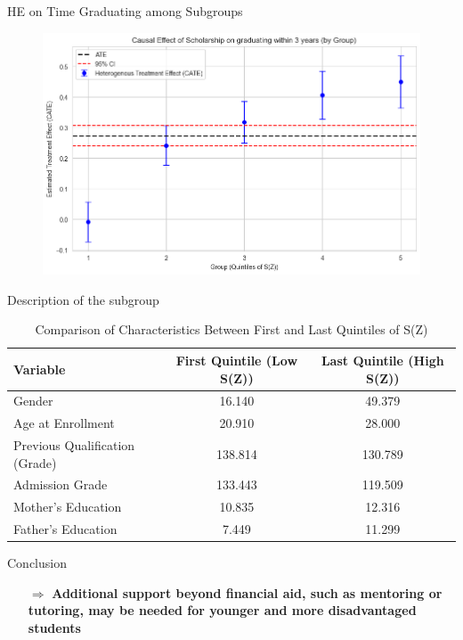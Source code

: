 \documentclass[aspectratio=169]{beamer}
\begin{document}
\begin{frame}{HE on Time Graduating among Subgroups}

\begin{figure}[h!]  
        \includegraphics[width=0.9\linewidth]{Tex_Pictures/HE_quintile_graduating.png} 

 
 \end{figure}   
\end{frame}



\begin{frame}{Description of the subgroup}
\begin{table}[h]
    \centering
    \begin{tabular}{l c c}
        \hline
        \textbf{Variable} & \textbf{First Quintile (Low S(Z))} & \textbf{Last Quintile (High S(Z))} \\
        \hline
        Gender & 16.140 & 49.379 \\
        Age at Enrollment & 20.910 & 28.000 \\
        Previous Qualification (Grade) & 138.814 & 130.789 \\
        Admission Grade & 133.443 & 119.509 \\
        Mother’s Education & 10.835 & 12.316 \\
        Father’s Education & 7.449 & 11.299 \\
        \hline
    \end{tabular}
    \caption{Comparison of Characteristics Between First and Last Quintiles of S(Z)}
    \label{tab:quintile_comparison_2}
\end{table}

 \begin{exampleblock}{Conclusion}
\vspace{-1pt}
\begin{itemize}
    \item [$\Rightarrow$]
\textbf{Additional support beyond financial aid, such as mentoring or tutoring, may be needed for younger and more disadvantaged students}
\end{itemize}
\vspace{-3pt}
	
\end{exampleblock}


\end{frame}
\end{document}

